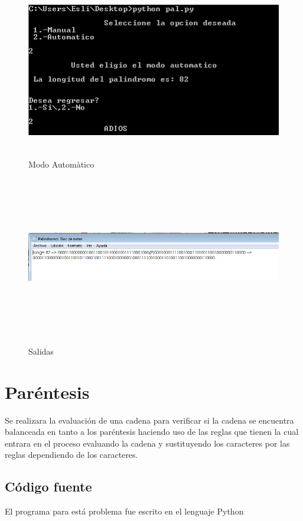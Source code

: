 \documentclass[12pt]{article}
\begin{document}
\begin{figure}[H]
\includegraphics[width=\textwidth, height=7cm]{auto_pal}
\label{fig:manual_afn}
\caption{Modo Automàtico}
\end{figure}

\begin{figure}[H]
\includegraphics[width=\textwidth, height=7cm]{auto_pal_salida}
\label{fig:manual_afn}
\caption{Salidas}
\end{figure}

\newpage
\section{Paréntesis}
Se realizara la evaluación de una cadena para verificar si la cadena se encuentra balanceada en tanto a los paréntesis haciendo uso de las reglas que tienen la cual entrara en el proceso evaluando la cadena y sustituyendo los caracteres por las reglas dependiendo de los caracteres.
\subsection{Código fuente}
El programa para está problema fue escrito en el lenguaje Python\\
\end{document}
